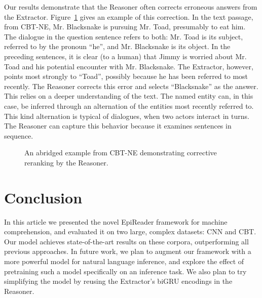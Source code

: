 \documentclass[11pt,letterpaper]{article}
\begin{document}
Our results demonstrate that the Reasoner often corrects erroneous answers from the Extractor. Figure~\ref{fig:snaketoad} gives an example of this correction. In the text passage, from CBT-NE, Mr. Blacksnake is pursuing Mr. Toad, presumably to eat him. The dialogue in the question sentence refers to both: Mr. Toad is its subject, referred to by the pronoun ``he'', and Mr. Blacksnake is its object. In the preceding sentences, it is clear (to a human) that Jimmy is worried about Mr. Toad and his potential encounter with Mr. Blacksnake. The Extractor, however, points most strongly to ``Toad'', possibly because he has been referred to most recently. The Reasoner corrects this error and selects ``Blacksnake'' as the answer. This relies on a deeper understanding of the text. The named entity can, in this case, be inferred through an alternation of the entities most recently referred to. This kind alternation is typical of dialogues, when two actors interact in turns. The Reasoner can capture this behavior because it examines sentences in sequence.

\begin{figure}
  \centering
  \caption{An abridged example from CBT-NE demonstrating corrective reranking by the Reasoner.}
  \label{fig:snaketoad}
\end{figure}

\section{Conclusion}
\label{sec:conc}
In this article we presented the novel EpiReader framework for machine comprehension, and evaluated it on two large, complex datasets: CNN and CBT. Our model achieves state-of-the-art results on these corpora, outperforming all previous approaches. In future work, we plan to augment our framework with a more powerful model for natural language inference, and explore the effect of pretraining such a model specifically on an inference task. We also plan to try simplifying the model by reusing the Extractor's biGRU encodings in the Reasoner.



\end{document}

